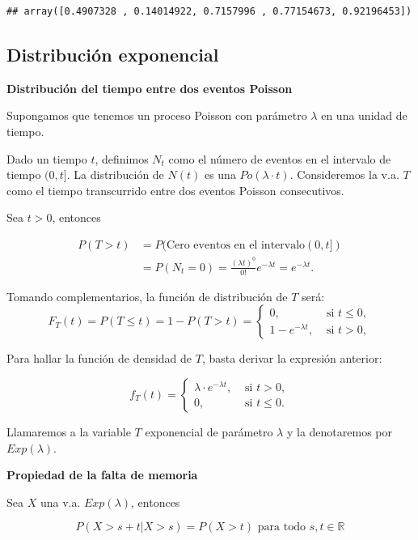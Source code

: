 \documentclass[]{book}
\begin{document}
\begin{verbatim}
## array([0.4907328 , 0.14014922, 0.7157996 , 0.77154673, 0.92196453])
\end{verbatim}

\hypertarget{distribuciuxf3n-exponencial}{%
\subsection{Distribución exponencial}\label{distribuciuxf3n-exponencial}}

\textbf{Distribución del tiempo entre dos eventos Poisson}

Supongamos que tenemos un proceso Poisson con parámetro \(\lambda\) en una unidad de tiempo.

Dado un tiempo \(t\), definimos \(N_{t}\) como el número de eventos en el intervalo de tiempo \((0,t]\). La distribución de \(N(t)\) es una \(Po(\lambda\cdot t)\). Consideremos la v.a. \(T\) como el tiempo transcurrido entre dos eventos Poisson consecutivos.

Sea \(t>0\), entonces

\[
\begin{array}{rl}
P(T>t)&=P(\mbox{Cero eventos en el intervalo}(0,t])\\
&=P(N_{t}=0)=
         \frac{(\lambda t)^0}{0!} e^{-\lambda
         t}=e^{-\lambda t}.
\end{array}
\]

Tomando complementarios, la función de distribución de \(T\) será:
\[
F_{T}(t)= P(T\leq t)=1-P(T>t)=\left\{\begin{array}{ll} 0, &\mbox{ si } t\leq 0,\\
  1-e^{-\lambda t},& \mbox{ si } t>0,\end{array}\right.
\]

Para hallar la función de densidad de \(T\), basta derivar la expresión anterior:

\[
f_{T}(t)=\left\{\begin{array}{ll}\lambda \cdot e^{-\lambda t}, & \mbox{ si }  t>0,\\
0, & \mbox{ si } t\leq 0. \end{array}\right.
\]

Llamaremos a la variable \(T\) exponencial de parámetro \(\lambda\) y la denotaremos por \(Exp(\lambda)\).

\textbf{Propiedad de la falta de memoria}

Sea \(X\) una v.a. \(Exp(\lambda)\), entonces

\[P(X>s+t\big|X>s)=P(X>t)\mbox{  para todo } s,t\in \mathbb{R}\]
\end{document}
